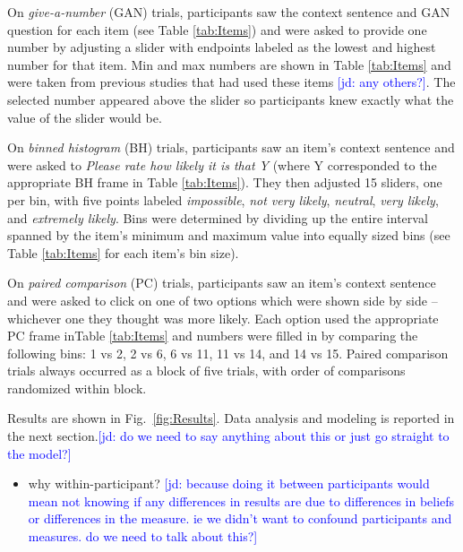 \documentclass[10pt,letterpaper]{article}
\newcommand{\jd}[1]{\textcolor{Blue}{[jd: #1]}}
\newcommand{\tableref}[1]{Table \ref{#1}}
\newcommand{\figref}[1]{Fig.~\ref{#1}}
\begin{document}
On  \emph{give-a-number} (GAN) trials, participants saw the context sentence and GAN question for each item (see \tableref{tab:Items}) and were asked to provide one number by adjusting a slider with endpoints labeled as the lowest and highest number for that item. Min and max numbers are shown in \tableref{tab:Items} and were taken from previous studies that had used these items \cite{DegenTessler2015:Wonky-worlds:-L,SchollerFranke2015:Semantic-values,KaoWu2014:Nonliteral-Unde}\jd{any others?}. The selected number appeared above the slider so participants knew exactly what the value of the slider would be. 

On \emph{binned histogram} (BH) trials, participants saw an item's context sentence and were asked to \emph{Please rate how likely it is that Y} (where Y corresponded to  the appropriate BH frame in \tableref{tab:Items}). They then adjusted 15 sliders, one per bin, with five points labeled \emph{impossible}, \emph{not very likely}, \emph{neutral}, \emph{very likely}, and \emph{extremely likely}. Bins were determined by dividing up the entire interval spanned by the item's minimum and maximum value into equally sized bins (see \tableref{tab:Items} for each item's bin size). 

On \emph{paired comparison} (PC) trials, participants  saw an item's context sentence and were asked to click on one of two options which were shown side by side -- whichever one they thought was more likely.  Each option used the appropriate PC frame in\tableref{tab:Items} and numbers were filled in by comparing the following bins: 1 vs 2, 2 vs 6, 6 vs 11, 11 vs 14, and 14 vs 15. Paired comparison trials always occurred as a block of five trials, with order of comparisons randomized within block.


Results are shown in \figref{fig:Results}. Data analysis and modeling is reported in the next section.\jd{do we need to say anything about this or just go straight to the model?}

\begin{itemize}
\item why within-participant? \jd{because doing it between participants would mean not knowing if any differences in results are due to differences in beliefs or differences in the measure. ie we didn't want to confound participants and measures. do we need to talk about this?}

\end{itemize}
\end{document}
